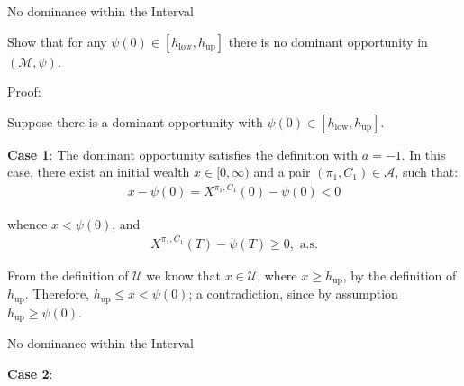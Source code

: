 \documentclass{beamer}
\begin{document}
\begin{frame}{No dominance within the Interval}

    {\footnotesize \footnotesize
    \par Show that for any $\psi(0) \in [h_{\text{low}}, h_{\text{up}}]$ there is no dominant opportunity in $(\mathcal{M}, \psi)$.
    \par Proof:
    \par Suppose there is a dominant opportunity with $\psi(0) \in [h_{\text{low}}, h_{\text{up}}]$.
    \par \textbf{Case 1}: The dominant opportunity satisfies the definition with $a = -1$. In this case, there exist 
    an initial wealth $x \in [0, \infty)$ and a pair $(\pi_1, C_1) \in \mathcal{A}$, such that:
    \begin{align*}
        x - \psi(0) = X^{\pi_1, C_1}(0) - \psi(0) < 0
    \end{align*}
    \par whence $x < \psi(0)$, and
    \begin{align*}
        X^{\pi_1, C_1}(T) - \psi(T) \geq 0, \text{ a.s.}
    \end{align*}
    \par From the definition of $\mathcal{U}$ we know that $x \in \mathcal{U}$, 
    where $x \geq h_{\text{up}}$, by the definition of $h_{\text{up}}$. 
    Therefore, $h_{\text{up}} \leq x < \psi(0)$; a contradiction, since by assumption $h_{\text{up}} \geq \psi(0)$.
    }

\end{frame} 

\begin{frame}{No dominance within the Interval}

    {\footnotesize \footnotesize
    \par \textbf{Case 2}: 
    }

\end{frame} 


    
\end{document}
